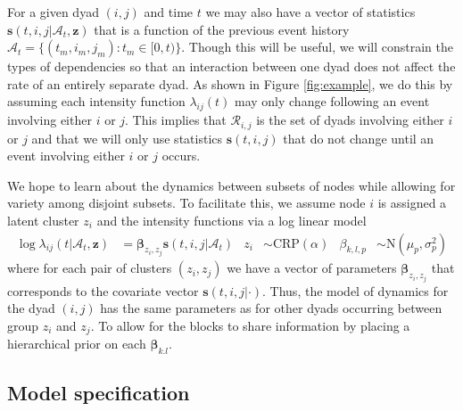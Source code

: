 \documentclass[11pt]{article}
\begin{document}
For a given dyad $(i,j)$ and time $t$ we may also have a vector of statistics $\mathbf{s}(t,i,j|\mathcal{A}_t,\mathbf{z})$ that is a function of the previous event history  $\mathcal{A}_t = \{(t_m,i_m,j_m): t_m \in [0,t)\}$.   Though this will be useful, we will constrain the types of dependencies so that an interaction between one dyad does not affect the rate of an entirely separate dyad.  As shown in Figure \ref{fig:example}, we do this by assuming each intensity function $\lambda_{ij}(t)$ may only change following an event involving either $i$ or $j$.  This implies that  $\mathcal{R}_{i,j}$ is the set of dyads involving either $i$ or $j$ and that we will only use  statistics $\mathbf{s}(t,i,j)$ that do not change until an event involving either $i$ or $j$ occurs.  

We hope to learn about the dynamics between subsets of nodes while allowing for variety among disjoint subsets.   To facilitate this, we assume node $i$ is assigned a latent cluster $z_i$ and the intensity functions via a log linear model
\begin{align*}
\log \lambda_{ij}(t | \mathcal{A}_t,\mathbf{z}) &= \boldsymbol{\beta}_{z_i,z_j} \mathbf{s}(t,i,j|\mathcal{A}_t) &
z_i &\sim \mbox{CRP}(\alpha) &
\beta_{k,l,p} &\sim \mbox{N}(\mu_p,\sigma_p^2)
\end{align*}
where for each pair of clusters $(z_i,z_j)$ we have a vector of parameters $\boldsymbol{\beta}_{z_i,z_j}$ that corresponds to the covariate vector $\mathbf{s}(t,i,j|\cdot)$.   Thus, the model of dynamics for the dyad $(i,j)$ has the same parameters as for other dyads occurring between group $z_i$ and $z_j$.  To allow for the blocks to share information by placing a hierarchical prior on each $\boldsymbol{\beta}_{k.l}$.

\subsection{Model specification}
  
\end{document}
